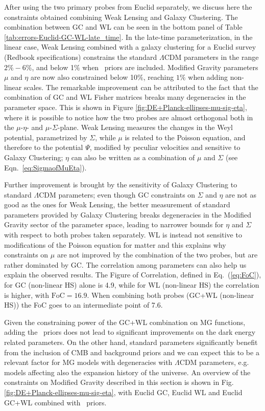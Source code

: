 After using the two primary probes from Euclid
separately, we discuss here the constraints obtained combining Weak
Lensing and Galaxy Clustering. 
The combination between GC and
WL can be seen in the bottom panel of Table
\ref{tab:errors-Euclid-GC-WL-late_time}.
In the late-time parameterization, in the linear case, Weak Lensing combined with a galaxy
clustering for a Euclid survey (Redbook specifications) constrains the standard $\Lambda$CDM parameters
in the range $2 \% - 6 \%$, and below 1$\%$ when \planck\ priors are included. Modified Gravity parameters $\mu$ and $\eta$ are now also constrained below 10$\%$, reaching $1\%$ when adding non-linear scales.
The remarkable improvement can be attributed
to the fact that the combination of GC and WL Fisher matrices breaks
many degeneracies in the parameter space. This is shown in Figure
\ref{fig:DE+Planck-ellipses-mu-sig-eta}, where it is possible to notice
how the two probes are almost orthogonal both in the $\mu$-$\eta$-
and $\mu$-$\Sigma$-plane. Weak Lensing measures
the changes in the Weyl potential, parametrized by $\Sigma$, while $\mu$ is related to the Poisson equation, and therefore to the potential $\Psi$, modified by peculiar velocities and sensitive to Galaxy Clustering; $\eta$ can also be written as a combination of $\mu$ and $\Sigma$ (see Eqn.\ \ref{eq:SigmaofMuEta}). 

Further improvement is brought by the sensitivity of Galaxy Clustering to standard $\Lambda$CDM parameters; even
though GC constraints on $\Sigma$ and $\eta$ are not as good as the ones for Weak Lensing, the better measurement of standard parameters provided by Galaxy Clustering breaks degeneracies in the Modified Gravity sector of the parameter space, leading to
narrower bounds for $\eta$ and $\Sigma$ with respect to both probes taken separately. WL is instead not sensitive to modifications of the Poisson equation for matter and this explains why constraints on $\mu$ are not improved
by the combination of the two probes, but are rather dominated by
GC. 
The correlation among parameters can also help us explain the observed results. 
The Figure of Correlation, defined in Eq.\ (\ref{eq:FoC}), for GC (non-linear HS) alone is 4.9, while
for WL (non-linear HS) the correlation is higher, with $\textrm{FoC}=16.9$.
When combining both probes (GC+WL (non-linear HS)) the FoC goes to an intermediate point of 7.6.

Given the constraining power of the GC+WL combination on MG functions, adding the \planck\ priors does not lead to significant improvements on the dark energy related parameters. On the other hand, standard parameters significantly benefit
from the inclusion of CMB and background priors and we can expect
this to be a relevant factor for MG models with degeneracies
with $\Lambda$CDM parameters, e.g. models affecting also the expansion
history of the universe.
An overview of the constraints on Modified Gravity described in this section is shown in Fig.\ref{fig:DE+Planck-ellipses-mu-sig-eta}, with Euclid GC, Euclid WL and Euclid GC+WL combined with \planck\ priors.


